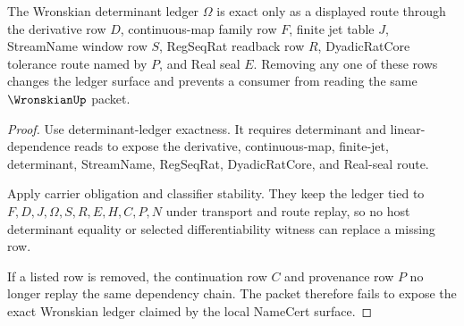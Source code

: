 \begin{theorem}
\label{thm:wronskian-ledger-exactness}
The Wronskian determinant ledger $\Omega$ is exact only as a displayed route through the derivative row $D$, continuous-map family row $F$, finite jet table $J$, StreamName window row $S$, RegSeqRat readback row $R$, DyadicRatCore tolerance route named by $P$, and Real seal $E$. Removing any one of these rows changes the ledger surface and prevents a consumer from reading the same $\WronskianUp$ packet.
\end{theorem}
\begin{proof}
Use determinant-ledger exactness. It requires determinant and linear-dependence reads to expose the derivative, continuous-map, finite-jet, determinant, StreamName, RegSeqRat, DyadicRatCore, and Real-seal route.

Apply carrier obligation and classifier stability. They keep the ledger tied to $F,D,J,\Omega,S,R,E,H,C,P,N$ under transport and route replay, so no host determinant equality or selected differentiability witness can replace a missing row.

If a listed row is removed, the continuation row $C$ and provenance row $P$ no longer replay the same dependency chain. The packet therefore fails to expose the exact Wronskian ledger claimed by the local NameCert surface.
\end{proof}

